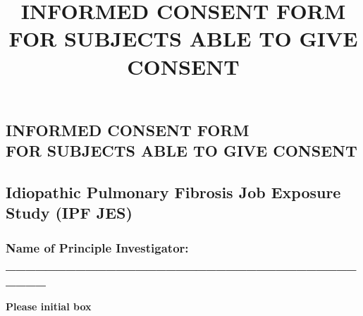 \documentclass[a4paper,10pt]{article}
\begin{document}
 \newpage\title{\bf INFORMED CONSENT FORM FOR SUBJECTS ABLE TO GIVE CONSENT}
 \date{}
 
 
 \pagestyle{fancy}
 
 
 \begin{centering} 
 \section*{INFORMED CONSENT FORM \\ FOR SUBJECTS ABLE TO GIVE CONSENT}
 \end{centering}

 \subsection*{Idiopathic Pulmonary Fibrosis Job Exposure Study (IPF JES)}

 \vspace{0.2cm}

 \subsubsection*{Name of Principle Investigator: \_\_\_\_\_\_\_\_\_\_\_\_\_\_\_\_\_\_\_\_\_\_\_\_\_\_\_\_\_\_\_\_\_\_\_\_\_\_\_}

 \vspace{0.5cm}

 \hfill \textbf{Please initial box}
\end{document}
